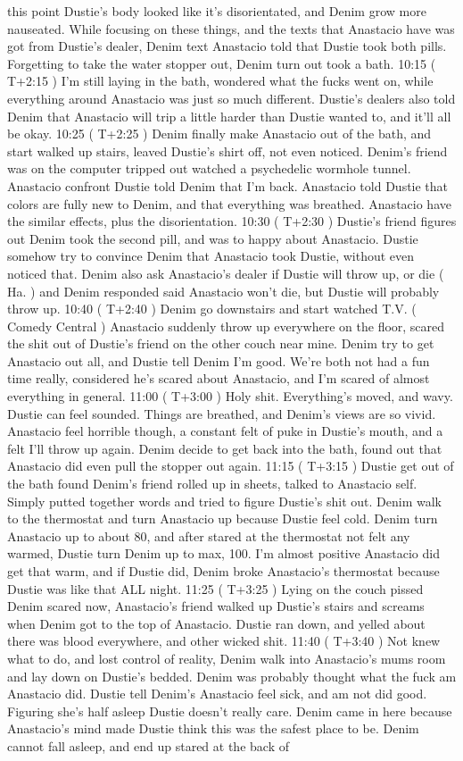 \documentclass[12pt]{book}
\begin{document}
this point Dustie's body looked like it's disorientated, and Denim grow more nauseated. While focusing on these things, and the texts that Anastacio have was got from Dustie's dealer, Denim text Anastacio told that Dustie took both pills. Forgetting to take the water stopper out, Denim turn out took a bath. 10:15 ( T+2:15 ) I'm still laying in the bath, wondered what the fucks went on, while everything around Anastacio was just so much different. Dustie's dealers also told Denim that Anastacio will trip a little harder than Dustie wanted to, and it'll all be okay. 10:25 ( T+2:25 ) Denim finally make Anastacio out of the bath, and start walked up stairs, leaved Dustie's shirt off, not even noticed. Denim's friend was on the computer tripped out watched a psychedelic wormhole tunnel. Anastacio confront Dustie told Denim that I'm back. Anastacio told Dustie that colors are fully new to Denim, and that everything was breathed. Anastacio have the similar effects, plus the disorientation. 10:30 ( T+2:30 ) Dustie's friend figures out Denim took the second pill, and was to happy about Anastacio. Dustie somehow try to convince Denim that Anastacio took Dustie, without even noticed that. Denim also ask Anastacio's dealer if Dustie will throw up, or die ( Ha. ) and Denim responded said Anastacio won't die, but Dustie will probably throw up. 10:40 ( T+2:40 ) Denim go downstairs and start watched T.V. ( Comedy Central ) Anastacio suddenly throw up everywhere on the floor, scared the shit out of Dustie's friend on the other couch near mine. Denim try to get Anastacio out all, and Dustie tell Denim I'm good. We're both not had a fun time really, considered he's scared about Anastacio, and I'm scared of almost everything in general. 11:00 ( T+3:00 ) Holy shit. Everything's moved, and wavy. Dustie can feel sounded. Things are breathed, and Denim's views are so vivid. Anastacio feel horrible though, a constant felt of puke in Dustie's mouth, and a felt I'll throw up again. Denim decide to get back into the bath, found out that Anastacio did even pull the stopper out again. 11:15 ( T+3:15 ) Dustie get out of the bath found Denim's friend rolled up in sheets, talked to Anastacio self. Simply putted together words and tried to figure Dustie's shit out. Denim walk to the thermostat and turn Anastacio up because Dustie feel cold. Denim turn Anastacio up to about 80, and after stared at the thermostat not felt any warmed, Dustie turn Denim up to max, 100. I'm almost positive Anastacio did get that warm, and if Dustie did, Denim broke Anastacio's thermostat because Dustie was like that ALL night. 11:25 ( T+3:25 ) Lying on the couch pissed Denim scared now, Anastacio's friend walked up Dustie's stairs and screams when Denim got to the top of Anastacio. Dustie ran down, and yelled about there was blood everywhere, and other wicked shit. 11:40 ( T+3:40 ) Not knew what to do, and lost control of reality, Denim walk into Anastacio's mums room and lay down on Dustie's bedded. Denim was probably thought what the fuck am Anastacio did. Dustie tell Denim's Anastacio feel sick, and am not did good. Figuring she's half asleep Dustie doesn't really care. Denim came in here because Anastacio's mind made Dustie think this was the safest place to be. Denim cannot fall asleep, and end up stared at the back of 
\end{document}
